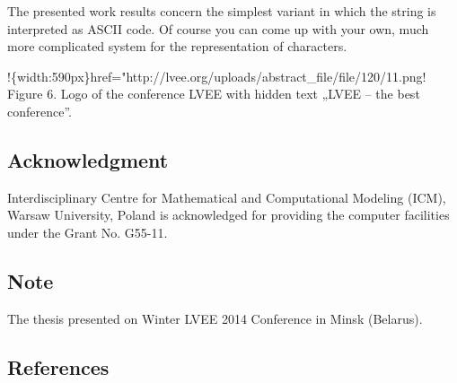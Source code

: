 \documentclass[10pt, a5paper]{article}
\begin{document}
The presented work results concern the simplest variant in which the string is interpreted as ASCII code. Of course you can come up with your own, much more complicated system for the representation of characters.

!\{width:590px\}href="http://lvee.org/uploads/abstract\_file/file/120/11.png!
Figure 6. Logo of the conference LVEE with hidden text „LVEE – the best conference”.

\subsection*{Acknowledgment}

Interdisciplinary Centre for Mathematical and Computational Modeling (ICM), Warsaw University, Poland is acknowledged for providing the computer facilities under the Grant No. G55-11.

\subsection*{Note}

The thesis presented on Winter LVEE 2014 Conference in Minsk (Belarus).

\subsection*{References}
\end{document}
